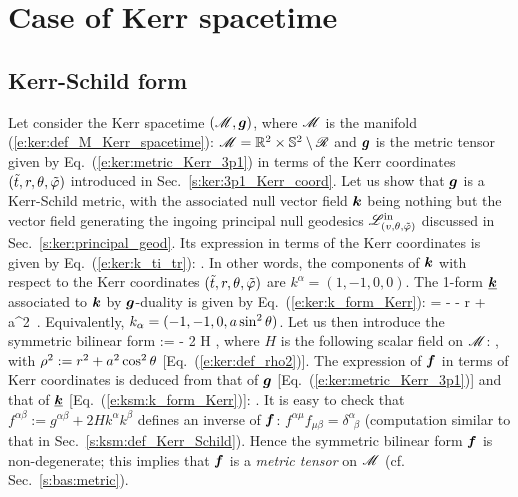 \section{Case of Kerr spacetime}

\subsection{Kerr-Schild form}

Let consider the Kerr spacetime $(\mathscr{M},\bm{g})$, where $\mathscr{M}$ is the manifold
(\ref{e:ker:def_M_Kerr_spacetime}): $\mathscr{M} = \mathbb{R}^2\times\mathbb{S}^2 \setminus \mathscr{R}$
and $\bm{g}$ is the metric tensor given by Eq.~(\ref{e:ker:metric_Kerr_3p1})
in terms of the Kerr coordinates $({\tilde t}, r, \theta,{\tilde\varphi})$ introduced in
Sec.~\ref{s:ker:3p1_Kerr_coord}.
Let us show that $\bm{g}$ is a Kerr-Schild metric, with the associated null vector
field $\bm{k}$ being nothing but the vector field generating the
ingoing principal null geodesics $\mathscr{L}^{\rm in}_{(v,\theta,{\tilde\varphi})}$  discussed in Sec.~\ref{s:ker:principal_geod}.
Its expression in terms of the Kerr coordinates is given by Eq.~(\ref{e:ker:k_ti_tr}):
\be \label{e:ksm:k_Kerr}
     .
\ee
In other words, the components of $\bm{k}$ with respect to the Kerr coordinates $({\tilde t}, r, \theta,{\tilde\varphi})$ are $k^\alpha = (1, -1, 0, 0)$.
The 1-form $\underline{\bm{k}}$ associated to $\bm{k}$ by $\bm{g}$-duality is
given by Eq.~(\ref{e:ker:k_form_Kerr}):
\be \label{e:ksm:k_form_Kerr}
     = - \dd \ti - \dd r + a\sin^2\th \, \dd\tph .
\ee
Equivalently, $k_\alpha = (-1, -1, 0, a\sin^2\theta)$.
Let us then introduce the symmetric bilinear form
\be
     :=  - 2 H  \otimes {} ,
\ee
where $H$ is the following scalar field on $\mathscr{M}$:
\be \label{e:ksm:H_Kerr}
   ,
\ee
with $\rho^2 := r^2 + a^2 \cos^2\theta$ [Eq.~(\ref{e:ker:def_rho2})].
The expression of $\bm{f}$ in terms of Kerr coordinates is deduced
from that of $\bm{g}$ [Eq.~(\ref{e:ker:metric_Kerr_3p1})] and that of
$\underline{\bm{k}}$ [Eq.~(\ref{e:ksm:k_form_Kerr})]:
\be \label{e:ksm:f_Kerr}
  .
\ee
It is easy to check that $f^{\alpha\beta} := g^{\alpha\beta} + 2 H k^\alpha k^\beta$
defines an inverse of $\bm{f}$: $f^{\alpha\mu} f_{\mu\beta} = \delta^\alpha_{\ \; \beta}$
(computation similar to that in Sec.~\ref{s:ksm:def_Kerr_Schild}). Hence the
symmetric bilinear form $\bm{f}$ is non-degenerate; this implies that $\bm{f}$
is a \emph{metric tensor} on $\mathscr{M}$ (cf. Sec.~\ref{s:bas:metric}).
